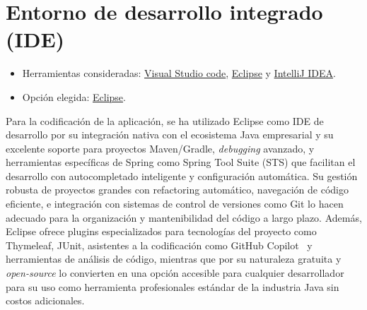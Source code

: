 \section{Entorno de desarrollo integrado (IDE)}\label{entorno-de-desarrollo-integrado}

\begin{itemize}
\tightlist
\item
  Herramientas consideradas: 
  \href{https://code.visualstudio.com/}{Visual Studio code}, 
  \href{https://eclipse.org/}{Eclipse} y
  \href{https://www.jetbrains.com/idea/}{IntelliJ IDEA}.
\item
  Opción elegida: \href{https://eclipse.org/}{Eclipse}.
\end{itemize}

Para la codificación de la aplicación, se ha utilizado Eclipse como IDE de desarrollo por su integración nativa con el ecosistema Java empresarial y su excelente soporte para proyectos Maven/Gradle, \emph{debugging} avanzado, y herramientas específicas de Spring como Spring Tool Suite (STS) que facilitan el desarrollo con autocompletado inteligente y configuración automática. Su gestión robusta de proyectos grandes con refactoring automático, navegación de código eficiente, e integración con sistemas de control de versiones como Git lo hacen adecuado para la organización y mantenibilidad del código a largo plazo. Además, Eclipse ofrece plugins especializados para tecnologías del proyecto como Thymeleaf, JUnit, asistentes a la codificación como GitHub Copilot~\cite{github-copilot} y herramientas de análisis de código, mientras que por su naturaleza gratuita y \emph{open-source} lo convierten en una opción accesible para cualquier desarrollador para su uso como herramienta profesionales estándar de la industria Java sin costos adicionales.
